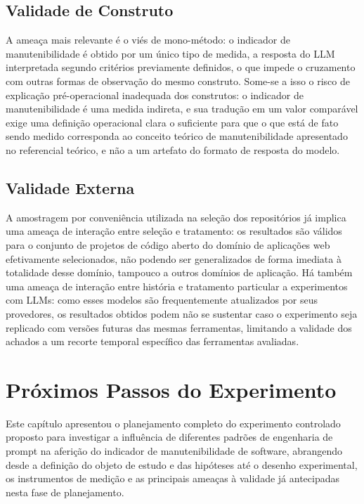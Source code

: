 \subsection{Validade de Construto}

A ameaça mais relevante é o viés de mono-método: o indicador de manutenibilidade é obtido por um único tipo de medida, a resposta do LLM interpretada segundo critérios previamente definidos, o que impede o cruzamento com outras formas de observação do mesmo construto. Some-se a isso o risco de explicação pré-operacional inadequada dos construtos: o indicador de manutenibilidade é uma medida indireta, e sua tradução em um valor comparável exige uma definição operacional clara o suficiente para que o que está de fato sendo medido corresponda ao conceito teórico de manutenibilidade apresentado no referencial teórico, e não a um artefato do formato de resposta do modelo.

\subsection{Validade Externa}

A amostragem por conveniência utilizada na seleção dos repositórios já implica uma ameaça de interação entre seleção e tratamento: os resultados são válidos para o conjunto de projetos de código aberto do domínio de aplicações web efetivamente selecionados, não podendo ser generalizados de forma imediata à totalidade desse domínio, tampouco a outros domínios de aplicação. Há também uma ameaça de interação entre história e tratamento particular a experimentos com LLMs: como esses modelos são frequentemente atualizados por seus provedores, os resultados obtidos podem não se sustentar caso o experimento seja replicado com versões futuras das mesmas ferramentas, limitando a validade dos achados a um recorte temporal específico das ferramentas avaliadas.

\section{Próximos Passos do Experimento}
\label{sec:proximos_passos}

Este capítulo apresentou o planejamento completo do experimento controlado proposto para investigar a influência de diferentes padrões de engenharia de prompt na aferição do indicador de manutenibilidade de software, abrangendo desde a definição do objeto de estudo e das hipóteses até o desenho experimental, os instrumentos de medição e as principais ameaças à validade já antecipadas nesta fase de planejamento.

